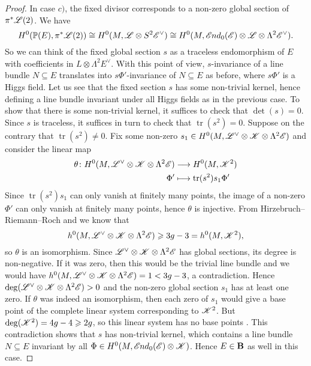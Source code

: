 \documentclass[A4paper, 12pt, british, reqno]{amsart}
\DeclareMathOperator{\tr}{tr}
\newcommand{\ot}{\otimes}
\newcommand{\dual}{^{\vee}}
\newcommand{\1}{\mathbbm{1}}
\begin{document}
\begin{lm}
\begin{proof}
	In case $c)$, the fixed divisor corresponds to a non-zero global section of $\pi^{*}\mathscr{L}(2)$.
	We have
	\[ H^{0}(\P(E),\pi^{*}\L(2))\cong H^{0}(M,\L\ot S^{2}\E\dual)\cong H^{0}(M,\sEnd_{0}(\E)\ot \L\ot \Lambda^{2}\E\dual). \]
	So we can think of the fixed global section $s$ as a traceless endomorphism of $E$ with coefficients in $L\ot \Lambda^{2}E\dual$.
	With this point of view, $s$-invariance of a line bundle $N\subseteq E$ translates into $s\Phi'$-invariance of $N\subseteq E$ as before, where $s\Phi'$ is a Higgs field.
	Let us see that the fixed section $s$ has some non-trivial kernel, hence defining a line bundle invariant under all Higgs fields as in the previous case.
	To show that there is some non-trivial kernel, it suffices to check that $\det(s)=0$.
	Since $s$ is traceless, it suffices in turn to check that $\tr(s^{2})=0$.
	Suppose on the contrary that $\tr(s^{2})\neq 0$.
	Fix some non-zero $s_{1}\in H^{0}(M,\L\dual\ot \sK\ot \Lambda^{2}\E)$ and consider the linear map
	\begin{align*}
	    \theta \colon H^{0}(M,\L\dual\ot\sK\ot \Lambda^{2}\E) & \longrightarrow H^{0}(M,\sK^{2}) \\
	    \Phi' & \longmapsto \tr(s^{2})s_{1}\Phi'
	\end{align*}
	Since $\tr(s^{2})s_{1}$ can only vanish at finitely many points, the image of a non-zero $\Phi'$ can only vanish at finitely many points, hence $\theta$ is injective.
	From Hirzebruch--Riemann--Roch and  we know that
	\[ h^{0}(M,\L\dual\ot\sK\ot \Lambda^{2}\E)\geqslant 3g-3=h^{0}(M,\sK^{2}), \]
	so $\theta$ is an isomorphism.
	Since $\L\dual\ot \sK\ot \Lambda^{2}\E$ has global sections, its degree is non-negative.
	If it was zero, then this would be the trivial line bundle and we would have $h^{0}(M,\L\dual\ot\sK\ot\Lambda^{2}\E)=1<3g-3$, a contradiction.
	Hence $\deg(\L\dual\ot\sK\ot\Lambda^{2}\E)>0$ and the non-zero global section $s_{1}$ has at least one zero.
	If $\theta$ was indeed an isomorphism, then each zero of $s_{1}$ would give a base point of the complete linear system corresponding to $\mathscr{K}^{2}$.
	But $\deg(\mathscr{K}^{2})=4g-4\geqslant 2g$, so this linear system has no base points \cite[Corollary IV.3.2]{har77}.
	This contradiction shows that $s$ has non-trivial kernel, which contains a line bundle $N\subseteq E$ invariant by all $\Phi\in H^{0}(M,\sEnd_{0}(\E)\ot \sK)$.
	Hence $E\in \mathbf{B}$ as well in this case.
    \end{proof}
\end{lm}
\end{document}
